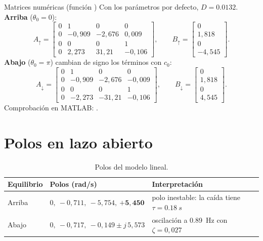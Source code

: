 \begin{ejemplo}{Matrices numéricas (función )}
Con los parámetros por defecto, $D=\num{0.0132}$. \textbf{Arriba} ($\theta_0=0$):
\[
A_\uparrow=\begin{bmatrix}
0&1&0&0\\ 0&-0{,}909&-2{,}676&0{,}009\\ 0&0&0&1\\ 0&2{,}273&31{,}21&-0{,}106\end{bmatrix},\qquad
B_\uparrow=\begin{bmatrix}0\\1{,}818\\0\\-4{,}545\end{bmatrix}.
\]
\textbf{Abajo} ($\theta_0=\pi$) cambian de signo los términos con $c_0$:
\[
A_\downarrow=\begin{bmatrix}
0&1&0&0\\ 0&-0{,}909&-2{,}676&-0{,}009\\ 0&0&0&1\\ 0&-2{,}273&-31{,}21&-0{,}106\end{bmatrix},\qquad
B_\downarrow=\begin{bmatrix}0\\1{,}818\\0\\4{,}545\end{bmatrix}.
\]
Comprobación en MATLAB: .
\end{ejemplo}

\section{Polos en lazo abierto}

\begin{table}[H]
\centering\small
\begin{tabular}{@{}lll@{}}
\toprule
Equilibrio & Polos (rad/s) & Interpretación\\
\midrule
Arriba & $0,\ -0{,}711,\ -5{,}754,\ \mathbf{+5{,}450}$ & polo inestable: la caída tiene $\tau=\SI{0.18}{s}$\\
Abajo & $0,\ -0{,}717,\ -0{,}149\pm j\,5{,}573$ & oscilación a \SI{0.89}{Hz} con $\zeta=0{,}027$\\
\bottomrule
\end{tabular}
\caption{Polos del modelo lineal.}
\label{tab:polos}
\end{table}

